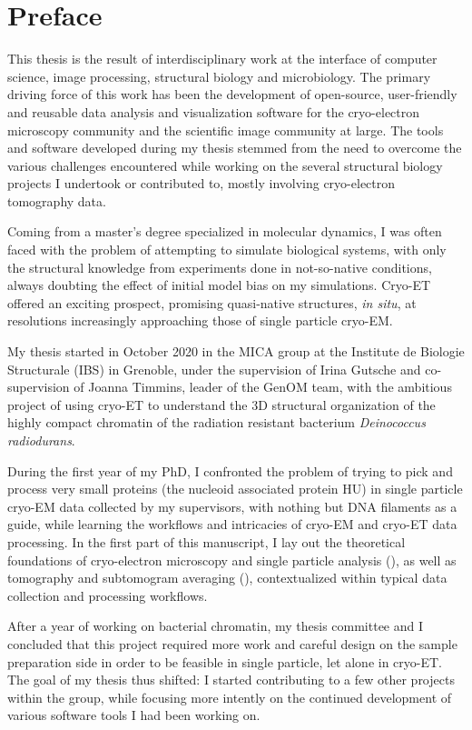 \chapter{Preface}

This thesis is the result of interdisciplinary work at the interface of computer science, image processing, structural biology and microbiology.
The primary driving force of this work has been the development of open-source, user-friendly and reusable data analysis and visualization software for the cryo-electron microscopy community and the scientific image community at large.
The tools and software developed during my thesis stemmed from the need to overcome the various challenges encountered while working on the several structural biology projects I undertook or contributed to, mostly involving cryo-electron tomography data.

Coming from a master's degree specialized in molecular dynamics, I was often faced with the problem of attempting to simulate biological systems, with only the structural knowledge from experiments done in not-so-native conditions, always doubting the effect of initial model bias on my simulations.
Cryo-ET offered an exciting prospect, promising quasi-native structures, \textit{in situ}, at resolutions increasingly approaching those of single particle cryo-EM.

My thesis started in October 2020 in the MICA group at the Institute de Biologie Structurale (IBS) in Grenoble, under the supervision of Irina Gutsche and co-supervision of Joanna Timmins, leader of the GenOM team, with the ambitious project of using cryo-ET to understand the 3D structural organization of the highly compact chromatin of the radiation resistant bacterium \textit{Deinococcus radiodurans}.

During the first year of my PhD, I confronted the problem of trying to pick and process very small proteins (the nucleoid associated protein HU) in single particle cryo-EM data collected by my supervisors, with nothing but DNA filaments as a guide, while learning the workflows and intricacies of cryo-EM and cryo-ET data processing.
In the first part of this manuscript, I lay out the theoretical foundations of cryo-electron microscopy and single particle analysis (), as well as tomography and subtomogram averaging (), contextualized within typical data collection and processing workflows.

After a year of working on bacterial chromatin, my thesis committee and I concluded that this project required more work and careful design on the sample preparation side in order to be feasible in single particle, let alone in cryo-ET.
The goal of my thesis thus shifted: I started contributing to a few other projects within the group, while focusing more intently on the continued development of various software tools I had been working on.

